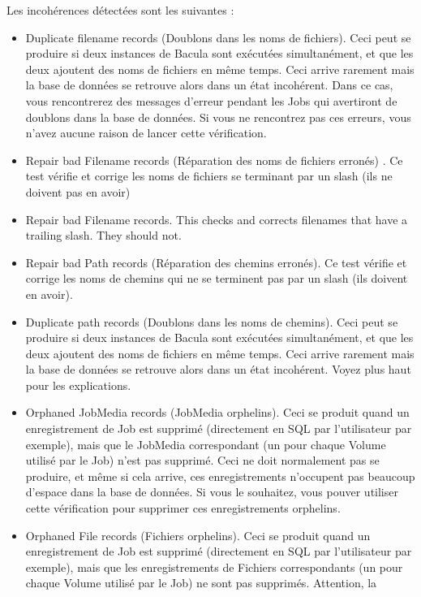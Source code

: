 Les incohérences détectées sont les suivantes : 

\begin{itemize}
\item Duplicate filename records (Doublons dans les noms de fichiers). Ceci peut
    se produire si deux instances de Bacula sont exécutées simultanément, et que
    les deux ajoutent des noms de fichiers en même temps. Ceci arrive rarement
    mais la base de données se retrouve alors dans un état incohérent. Dans ce
    cas, vous rencontrerez des messages d'erreur pendant les Jobs qui avertiront
    de doublons dans la base de données. Si vous ne rencontrez pas ces erreurs,
    vous n'avez aucune raison de lancer cette vérification.
\item Repair bad Filename records (Réparation des noms de fichiers erronés) . Ce
    test vérifie et corrige les noms de fichiers se terminant par un slash (ils
    ne doivent pas en avoir)
\item Repair bad Filename records. This checks and corrects filenames  that
   have a trailing slash. They should not.  
\item Repair bad Path records (Réparation des chemins erronés). Ce test vérifie
    et corrige les noms de chemins qui ne se terminent pas par un slash (ils 
    doivent en avoir).
\item Duplicate path records (Doublons dans les noms de chemins). Ceci peut 
    se produire si deux instances de Bacula sont exécutées simultanément, et que
    les deux ajoutent des noms de fichiers en même temps. Ceci arrive rarement
    mais la base de données se retrouve alors dans un état incohérent. Voyez
    plus haut pour les explications.
\item Orphaned JobMedia records (JobMedia orphelins). Ceci se produit quand un
    enregistrement de Job est supprimé (directement en SQL par l'utilisateur par
    exemple), mais que le JobMedia correspondant (un pour chaque Volume utilisé
    par le Job) n'est pas supprimé. Ceci ne doit normalement pas se produire, et
    même si cela arrive, ces enregistrements n'occupent pas beaucoup d'espace 
    dans la base de données. Si vous le souhaitez, vous pouver utiliser cette
    vérification pour supprimer ces enregistrements orphelins.
\item Orphaned File records (Fichiers orphelins). Ceci se produit quand un 
    enregistrement de Job est supprimé (directement en SQL par l'utilisateur par
    exemple), mais que les enregistrements de Fichiers correspondants (un pour
    chaque Volume utilisé par le Job) ne sont pas supprimés. Attention, la 

\end{itemize}
